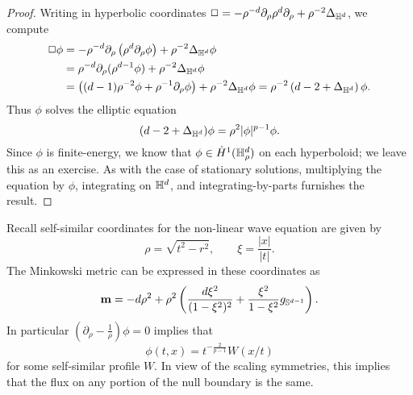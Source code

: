 \begin{proof}
	Writing in hyperbolic coordinates $\Box = -\rho^{-d} \partial_\rho \rho^d \partial_\rho + \rho^{-2} \Delta_{\mathbb H^d}$, we compute 
		\begin{align*}
			\Box \phi 
				&= - \rho^{-d} \partial_\rho \left( \rho^d \partial_\rho \phi \right) + \rho^{-2}\Delta_{\mathbb H^d} \phi \\
				&=  \rho^{-d} \partial_\rho (\rho^{d - 1} \phi) +  \rho^{-2}\Delta_{\mathbb H^d} \phi \\
				&= \left( (d - 1) \rho^{-2} \phi + \rho^{-1} \partial_\rho \phi \right) +  \rho^{-2}  \Delta_{\mathbb H^d} \phi = \rho^{-2} \left( d - 2 +  \Delta_{\mathbb H^d} \right) \phi. 
		\end{align*}
	Thus $\phi$ solves the elliptic equation 
		\[
			(d - 2 + \Delta_{\mathbb H^d}) \phi = \rho^2 |\phi|^{p - 1} \phi. 
		\]	
	Since $\phi$ is finite-energy, we know that $\phi \in \dot H^1 (\mathbb H^d_\rho)$ on each hyperboloid; we leave this as an exercise. As with the case of stationary solutions, multiplying the equation by $\phi$, integrating on $\mathbb H^d$, and integrating-by-parts furnishes the result. 
\end{proof}

\begin{remark}
	Recall self-similar coordinates for the non-linear wave equation are given by 
		\[
			\rho = \sqrt{t^2 - r^2}, \qquad \xi = \frac{|x|}{|t|}.
		\]
	The Minkowski metric can be expressed in these coordinates as 
		\[
			{\bf m} = - d \rho^2 + \rho^2 \left( \frac{d \xi^2}{(1 - \xi^2)^2} + \frac{\xi^2}{1 - \xi^2} g_{\mathbb S^{d - 1}}\right).
		\]	
	In particular $(\partial_\rho - \tfrac1\rho) \phi = 0$ implies that 
		\[
			\phi(t, x) = t^{-\frac{2}{p - 1}} W(x/t)
		\]
	for some self-similar profile $W$. In view of the scaling symmetries, this implies that the flux on any portion of the null boundary is the same. 		
\end{remark}